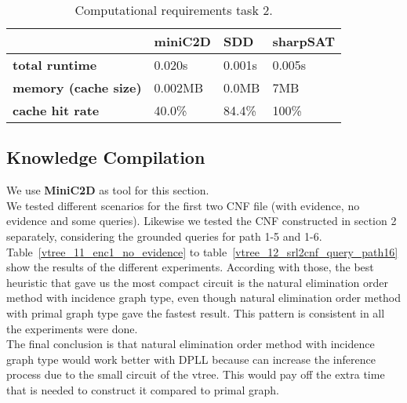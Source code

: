 \begin{table}[h]
	\centering
	\caption{Computational requirements task 2.}
	\label{table:comptask2}
	\begin{tabular}{l|l|l|l}
		\textbf{}        & \textbf{miniC2D} & \textbf{SDD} & \textbf{sharpSAT} \\ \hline
		\textbf{total runtime} &  0.020s  &   0.001s   &   0.005s  \\ \hline
		\textbf{memory (cache size)}  &  0.002MB  &   0.0MB &   7MB  \\ \hline
		\textbf{cache hit rate}  & 40.0\%  & 84.4\% &   100\%
	\end{tabular}
\end{table}

\subsection{Knowledge Compilation}\label{subsec:knowledgecompilation}

We use \textbf{MiniC2D} as tool for this section.
\\[2ex]
We tested different scenarios for the first two CNF file (with evidence, no evidence and some queries). Likewise we tested the CNF constructed in section 2 separately, considering the grounded queries for path 1-5 and 1-6.
\\[2ex]
Table~\ref{vtree_11_enc1_no_evidence} to table~\ref{vtree_12_srl2cnf_query_path16} show the results of the different experiments. According with those, the best heuristic that gave us the most compact circuit is the natural elimination order method with incidence graph type, even though natural elimination order method with primal graph type gave the fastest result. This pattern is consistent in all the experiments were done.
\\[2ex]
The final conclusion is that natural elimination order method with incidence graph type would work better with DPLL because can increase the inference process due to the small circuit of the vtree. This would pay off the extra time that is needed to construct it compared to primal graph.










